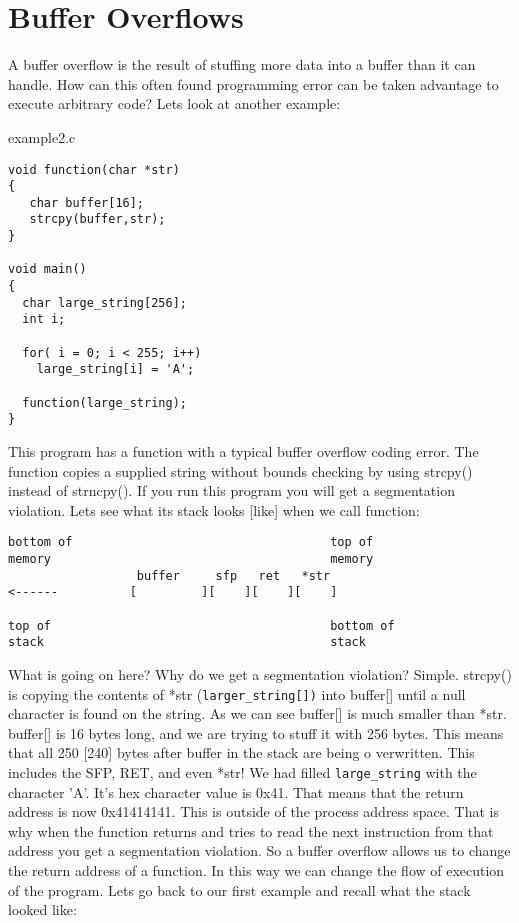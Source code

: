 \documentclass[12pt]{article}
\begin{document}
\section{Buffer Overflows}

A buffer overflow is the result of stuffing more data into a buffer than it can handle. How can this often found 
programming error can be taken advantage to execute arbitrary code? Lets look at another example:

example2.c 

\begin{lstlisting}
void function(char *str) 
{
   char buffer[16];
   strcpy(buffer,str);
}

void main() 
{
  char large_string[256];
  int i;

  for( i = 0; i < 255; i++)
    large_string[i] = 'A';

  function(large_string);
}
\end{lstlisting}

This program has a function with a typical buffer overflow coding error. The function copies a supplied string 
without bounds checking by using strcpy() instead of strncpy(). If you run this program you will get a segmentation violation. Lets see what its stack looks [like] when we call function: 

{\small
\begin{verbatim}
bottom of                                    top of
memory                                       memory
                  buffer     sfp   ret   *str
<------          [         ][    ][    ][    ]

top of                                       bottom of
stack                                        stack
\end{verbatim}
}
What is going on here? Why do we get a segmentation violation? Simple. strcpy() is copying the contents of  
*str (\verb+larger_string[])+ into buffer[] until a null character  is found on the string. As we can see buffer[] is much 
smaller than *str. buffer[] is 16 bytes long, and we are trying to stuff it with 256 bytes. This means that all 250 
[240] bytes after buffer in the stack are being o verwritten. This includes the SFP, RET, and even *str! We had 
filled \verb+large_string+ with the character 'A'. It's hex character value is 0x41. That means that the return 
address is now 0x41414141. This is outside of the process address space.  That is why when the function returns 
and tries to read the next instruction from that address you get a segmentation violation. So a buffer overflow 
allows us to change the return address of a function. In this way we can change the flow of execution of the 
program. Lets go back to our first example and recall what the stack looked like: 
\end{document}
